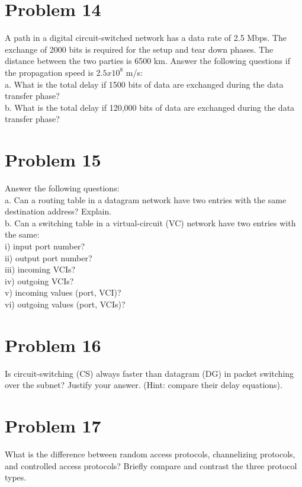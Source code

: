 \documentclass{article}
\begin{document}
\section*{Problem 14}
A path in a digital circuit-switched network has a data rate of 2.5 Mbps. The exchange of 2000 bits
is required for the setup and tear down phases. The distance between the two parties is 6500 km.
Answer the following questions if the propagation speed is $2.5x10^8$ m/s:\\
\subP a. What is the total delay if 1500 bits of data are exchanged during the data transfer phase?\\
\subP b. What is the total delay if 120,000 bits of data are exchanged during the data transfer
phase?\\

\section*{Problem 15}
Answer the following questions:\\
\subP a. Can a routing table in a datagram network have two entries with the same
destination address? Explain.\\
\subP b. Can a switching table in a virtual-circuit (VC) network have two entries with
the same:\\
\subP\subP i) input port number?\\
\subP\subP ii) output port number?\\
\subP\subP iii) incoming VCIs?\\
\subP\subP iv) outgoing VCIs?\\
\subP\subP v) incoming values (port, VCI)?\\
\subP\subP vi) outgoing values (port, VCIs)?\\

\section*{Problem 16}
Is circuit-switching (CS) always faster than datagram (DG) in packet switching over the
subnet? Justify your answer. (Hint: compare their delay equations).\\

\section*{Problem 17}
What is the difference between random access protocols, channelizing protocols, and
controlled access protocols? Briefly compare and contrast the three protocol types.\\
\end{document}
